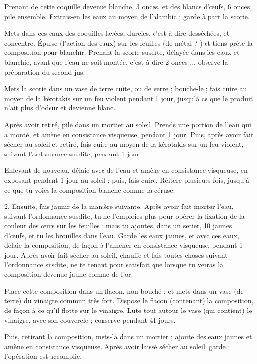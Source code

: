 \documentclass[a4paper, 11pt, oneside, polutonikogreek, french]{article}
\begin{document}
Prenant de cette coquille devenue blanche, 3 onces, et des blancs d'œufs, 6 onces, pile ensemble. Extrais-en les eaux au moyen de l'alambic ; garde à part la scorie.

Mets dans ces eaux des coquilles lavées, durcies, c'est-à-dire desséchées, et concentre. Épuise (l'action des eaux) sur les feuilles (de métal ? ) et tiens prête la composition pour blanchir. Prenant la scorie susdite, délayée dans les eaux et blanchie, avant que l'eau ne soit montée, c'est-à-dire 2 onces ... observe la préparation du second jus.

Mets la scorie dans un vase de terre cuite, ou de verre ; bouche-le ; fais cuire au moyen de la kérotakis sur un feu violent pendant 1 jour, jusqu'à ce que le produit n'ait plus d'odeur et devienne blanc.

Après avoir retiré, pile dans un mortier au soleil. Prends une portion de l'eau qui a monté, et amène en consistance visqueuse, pendant 1 jour. Puis, après avoir fait sécher au soleil et retiré, fais cuire au moyen de la kérotakis sur un feu violent, suivant l'ordonnance susdite, pendant 1 jour.

Enlevant de nouveau, délaie avec de l'eau et amène en consistance visqueuse, en exposant pendant 1 jour au soleil ; puis, fais cuire. Réitère plusieurs fois, jusqu'à ce que tu voies la composition blanche comme la céruse.

2. Ensuite, fais jaunir de la manière suivante. Après avoir fait monter l'eau, suivant l'ordonnance susdite, tu ne l'emploies plus pour opérer la fixation de la couleur des œufs sur les feuilles ; mais tu ajoutes, dans un setier, 10 jaunes d'œufs, et tu les brouilles dans l'eau. Garde les eaux jaunes, et avec ces eaux, délaie la composition, de façon à l'amener en consistance visqueuse, pendant 1 jour. Après avoir fait sécher au soleil, chauffe et fais toutes choses suivant l'ordonnance susdite, ne te tenant pour satisfait que lorsque tu verras la composition devenue jaune comme de l'or.

Place cette composition dans un flacon, non bouché ; et mets dans un vase (de terre) du vinaigre commun très fort. Dispose le flacon (contenant) la composition, de façon à ce qu'il flotte sur le vinaigre. Lute tout autour le vase (qui contient) le vinaigre, avec son couvercle ; conserve pendant 41 jours.

Puis, retirant la composition, mets-la dans un mortier ; ajoute des eaux jaunes et amène en consistance visqueuse. Après avoir laissé sécher au soleil, garde : l'opération est accomplie.
\end{document}
